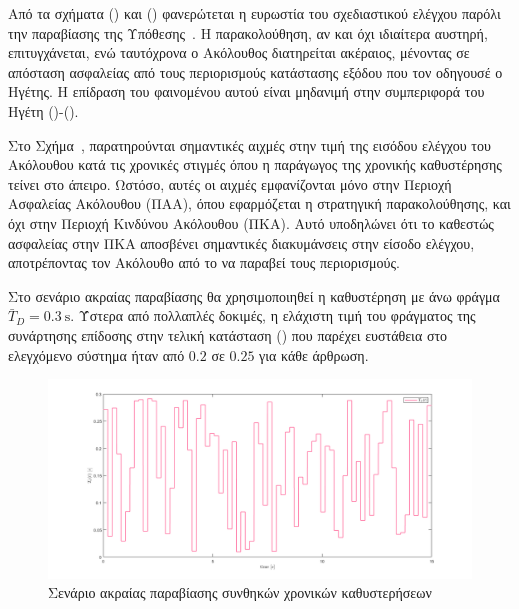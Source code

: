 \begin{observation} \label{figobs5}
Από τα σχήματα () και () φανερώτεται η ευρωστία του σχεδιαστικού ελέγχου παρόλι την παραβίασης της Υπόθεσης~. Η παρακολούθηση, αν και όχι ιδιαίτερα αυστηρή, επιτυγχάνεται, ενώ ταυτόχρονα ο Ακόλουθος διατηρείται ακέραιος, μένοντας σε απόσταση ασφαλείας από τους περιορισμούς κατάστασης εξόδου που τον οδηγουσέ ο Ηγέτης. Η επίδραση του φαινομένου αυτού είναι μηδανιμή στην συμπεριφορά του Ηγέτη ()-().
\end{observation}

\begin{observation} \label{figobs6}
Στο Σχήμα~, παρατηρούνται σημαντικές αιχμές στην τιμή της εισόδου ελέγχου του Ακόλουθου κατά τις χρονικές στιγμές όπου η παράγωγος της χρονικής καθυστέρησης τείνει στο άπειρο. Ωστόσο, αυτές οι αιχμές εμφανίζονται μόνο στην Περιοχή Ασφαλείας Ακόλουθου (ΠΑΑ), όπου εφαρμόζεται η στρατηγική παρακολούθησης, και όχι στην Περιοχή Κινδύνου Ακόλουθου (ΠΚΑ). Αυτό υποδηλώνει ότι το καθεστώς ασφαλείας στην ΠΚΑ αποσβένει σημαντικές διακυμάνσεις στην είσοδο ελέγχου, αποτρέποντας τον Ακόλουθο από το να παραβεί τους περιορισμούς.
\end{observation}

\bigskip
Στο σενάριο ακραίας παραβίασης θα χρησιμοποιηθεί η καθυστέρηση με άνω φράγμα $\bar{T}_{D} = 0.3\ \text{s}$. Ύστερα από πολλαπλές δοκιμές, η ελάχιστη τιμή του φράγματος της συνάρτησης επίδοσης στην τελική κατάσταση () που παρέχει ευστάθεια στο ελεγχόμενο σύστημα ήταν από $\mathbf{0.2}$ σε $\mathbf{0.25}$ για κάθε άρθρωση.


\begin{figure}[H]
    \centering
    \includegraphics[width=0.9\linewidth]{Chapters/Chapter3/Figures/Sim3Fig1.png}
    \caption[Σενάριο ακραίας παραβίασης συνθηκών χρονικών καθυστερήσεων]{Σενάριο ακραίας παραβίασης συνθηκών χρονικών καθυστερήσεων}
    \label{Sim3Fig1}
\end{figure}


